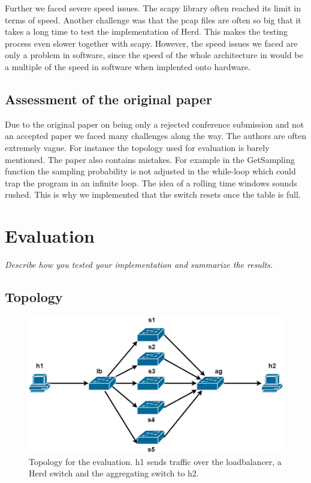 \documentclass[11pt,oneside,a4paper]{article}
\newcommand{\hint}[1]{{\color{blue} \em #1}}
\begin{document}
Further we faced severe speed issues. The scapy library often reached its limit in terms of speed. Another challenge was that the pcap files are often so big that it takes a long time to test the implementation of Herd. This makes the testing process even slower together with scapy. 
However, the speed issues we faced are only a problem in software, since the speed of the whole architecture in would be a multiple of the speed in software when implented onto hardware.

\subsection{Assessment of the original paper} \label{original_paper}
Due to the original paper on being only a rejected conference submission and not an accepted paper we faced many challenges along the way. The authors are often extremely vague. For instance the topology used for evaluation is barely mentioned. The paper also contains mistakes. For example in the GetSampling function the sampling probability is not adjusted in the while-loop which could trap the program in an infinite loop. The idea of a rolling time windows sounds rushed. This is why we implemented that the switch resets once the table is full.


\section{Evaluation}
\hint{Describe how you tested your implementation and summarize the results.} \\
\subsection{Topology} \label{topology}

\begin{figure}
	\centering
	\includegraphics[width=1\textwidth]{figures/Herd_topology}
	\caption{Topology for the evaluation. h1 sends traffic over the loadbalancer, a Herd switch and the aggregating switch to h2.}
	\label{fig:topology_fig}
\end{figure}
\end{document}
